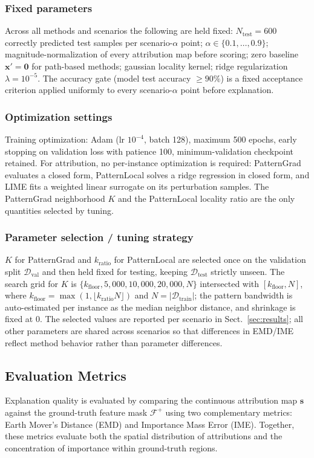 \documentclass[pdflatex,sn-mathphys-num]{sn-jnl}
\theoremstyle{thmstyleone}
\theoremstyle{thmstyletwo}%
\theoremstyle{thmstylethree}%
\begin{document}
\subsubsection{Fixed parameters}
Across all methods and scenarios the following are held fixed: $N_{\text{test}}=600$ correctly predicted test samples per scenario-$\alpha$ point; $\alpha\in\{0.1,\dots,0.9\}$; magnitude-normalization of every attribution map before scoring; zero baseline $\mathbf{x}'=\mathbf{0}$ for path-based methods; gaussian locality kernel; ridge regularization $\lambda=10^{-5}$. The accuracy gate (model test accuracy $\ge 90\%$) is a fixed acceptance criterion applied uniformly to every scenario-$\alpha$ point before explanation.

\subsubsection{Optimization settings}
Training optimization: Adam (lr $10^{-4}$, batch 128), maximum 500 epochs, early stopping on validation loss with patience 100, minimum-validation checkpoint retained. For attribution, no per-instance optimization is required: PatternGrad evaluates a closed form, PatternLocal solves a ridge regression in closed form, and LIME fits a weighted linear surrogate on its perturbation samples. The PatternGrad neighborhood $K$ and the PatternLocal locality ratio are the only quantities selected by tuning.

\subsubsection{Parameter selection / tuning strategy}
$K$ for PatternGrad and $k_{\text{ratio}}$ for PatternLocal are selected once on the validation split $\mathcal{D}_{\text{val}}$ and then held fixed for testing, keeping $\mathcal{D}_{\text{test}}$ strictly unseen. The search grid for $K$ is $\{k_{\text{floor}}, 5{,}000, 10{,}000, 20{,}000, N\}$ intersected with $[k_{\text{floor}},N]$, where $k_{\text{floor}}=\max(1,\lfloor k_{\text{ratio}}N\rfloor)$ and $N=|\mathcal{D}_{\text{train}}|$; the pattern bandwidth is auto-estimated per instance as the median neighbor distance, and shrinkage is fixed at 0. The selected values are reported per scenario in Sect.~\ref{sec:results}; all other parameters are shared across scenarios so that differences in EMD/IME reflect method behavior rather than parameter differences.

\subsection{Evaluation Metrics}\label{sec:eval_metrics}
Explanation quality is evaluated by comparing the continuous attribution map $\mathbf{s}$ against the ground-truth feature mask $\mathcal{F}^+$ using two complementary metrics: Earth Mover's Distance (EMD) and Importance Mass Error (IME). Together, these metrics evaluate both the spatial distribution of attributions and the concentration of importance within ground-truth regions.
\end{document}
